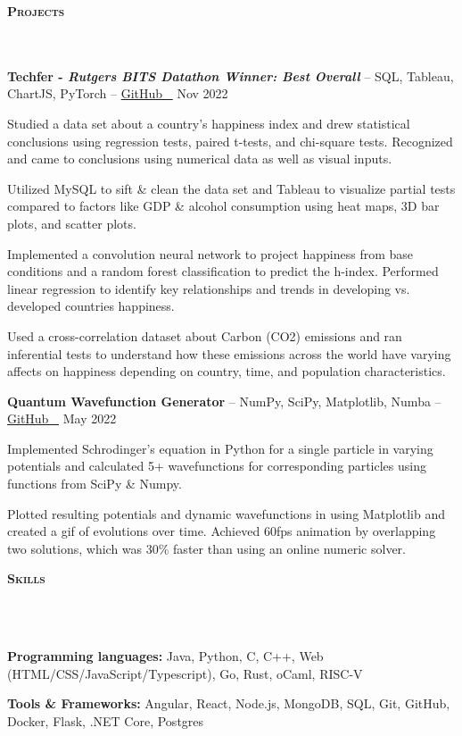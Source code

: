 \documentclass{article}
\newcommand{\header}[1]{{
\hspace*{0pt}\vspace*{6pt} \textsc{#1}} \vspace*{-6pt} 
\lineunder
}
\newcommand{\lineunder}{
\vspace*{-8pt} \\ \hspace*{-3pt} 
\hrulefill \\
}
\newcommand{\project}[3]{{
\vspace*{2pt}%
\textbf{#1} #2 \hfill #3\vspace*{2pt}}
}
\renewcommand{\labelitemii}{
$\vcenter{\hbox{\tiny$\bullet$}}$\hspace*{-3pt}
}
\newenvironment{bullet-list-major}{
\begin{list}{\labelitemii}{\setlength\leftmargin{9pt} 
\topsep 0pt \itemsep -2pt}}{\vspace*{4pt}\end{list}
}
\newenvironment{bullet-list-minor}{
\begin{list}{\labelitemii}{\setlength\leftmargin{15pt} 
\topsep 0pt \itemsep -2pt}}{\vspace*{4pt}\end{list}
}
\begin{document}
\vspace*{4pt}%
\header{\textbf{Projects}}
    \project{Techfer - \emph{Rutgers BITS Datathon Winner: Best Overall}}{-- SQL, Tableau, ChartJS, PyTorch -- \href{https://github.com/akhilvreddy/Rutgers-BITS-Datathon}{GitHub \faGithub\ }}{Nov 2022}
    \begin{bullet-list-minor}
    \item Studied a data set about a country's happiness index and drew statistical conclusions using regression tests, paired t-tests, and chi-square tests. Recognized and came to conclusions using numerical data as well as visual inputs.
    \item Utilized MySQL to sift \& clean the data set and Tableau to visualize partial tests compared to factors like GDP \& alcohol consumption using heat maps, 3D bar plots, and scatter plots.
    \item Implemented a convolution neural network to project happiness from base conditions and a random forest classification to predict the h-index. Performed linear regression to identify key relationships and trends in developing vs. developed countries happiness.
    
    \item Used a cross-correlation dataset about Carbon (CO2) emissions and ran inferential tests to understand how these emissions across the world have varying affects on happiness depending on country, time, and population characteristics.
    
    \end{bullet-list-minor}


    \project{Quantum Wavefunction Generator}{-- NumPy, SciPy, Matplotlib, Numba -- \href{https://github.com/akhilvreddy/Quantum-Wavefunction-Analysis}{GitHub \faGithub\ }}{May 2022}
	\begin{bullet-list-minor}
	\item Implemented Schrodinger's equation in Python for a single particle in varying potentials and calculated 5+ wavefunctions for corresponding particles using functions from SciPy \& Numpy. 
	\item Plotted resulting potentials and dynamic wavefunctions in  using Matplotlib and created a gif of evolutions over time. Achieved 60fps animation by overlapping two solutions, which was 30\% faster than using an online numeric solver.
    \end{bullet-list-minor}

\vspace*{4pt}%
\header{\textbf{Skills}}
    \begin{bullet-list-major}
    \item \textbf{Programming languages:} Java, Python, C, C++, Web (HTML/CSS/JavaScript/Typescript), Go, Rust, oCaml, RISC-V
    \item \textbf{Tools \& Frameworks:} Angular, React, Node.js, MongoDB, SQL, Git, GitHub, Docker, Flask, .NET Core, Postgres
    
    \end{bullet-list-major}
\end{document}
